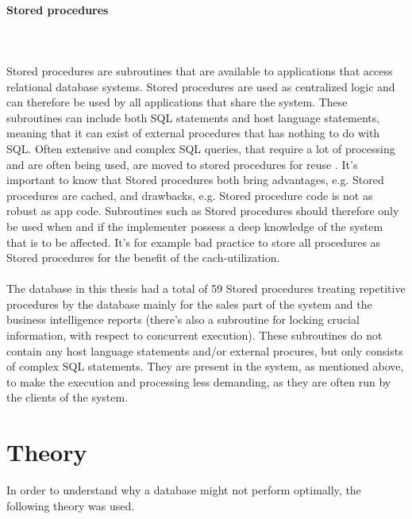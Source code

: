 \documentclass{cslthse-msc}
\begin{document}
\paragraph*{Stored procedures}\mbox{}\\\\ 
Stored procedures are subroutines that are available to applications that access relational database systems. Stored procedures are used as centralized logic and can therefore be used by all applications that share the system. These subroutines can include both SQL statements and host language statements, meaning that it can exist of external procedures that has nothing to do with SQL. Often extensive and complex SQL queries, that require a lot of processing and are often being used, are moved to stored procedures for reuse \cite{StoredProcedures}. It's important to know that Stored procedures both bring advantages, e.g. Stored procedures are cached, and drawbacks, e.g. Stored procedure code is not as robust as app code. Subroutines such as Stored procedures should therefore only be used when and if the implementer possess a deep knowledge of the system that is to be affected. It's for example bad practice to store all procedures as Stored procedures for the benefit of the cach-utilization.\\\\
The database in this thesis had a total of 59 Stored procedures treating repetitive procedures by the database mainly for the sales part of the system and the business intelligence reports (there's also a subroutine for locking crucial information, with respect to concurrent execution). These subroutines do not contain any host language statements and/or external procures, but only consists of complex SQL statements. They are present in the system, as mentioned above, to make the execution and processing less demanding, as they are often run by the clients of the system. 
\section{Theory}
In order to understand why a database might not perform optimally, the following theory was used.
\end{document}
